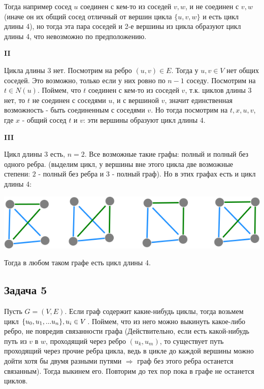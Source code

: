 \documentclass{article}
\begin{document}
 Тогда например сосед $u$ соединен с кем-то из соседей $v, w$, и не соединен с $v, w$ (иначе он их общий сосед отличный от вершин цикла $\{u, v, w\}$ и есть цикл длины 4), но тогда эта пара соседей и 2-е вершины из цикла образуют цикл длины 4, что невозможно по предположению. 

\textbf{II}

Цикла длины 3 нет. Посмотрим на ребро $(u, v) \in E$. Тогда у $u, v \in V$ нет общих соседей. Это  возможно, только если у них ровно по $ n - 1 $ соседу. Посмотрим на $t \in N(u)$. Поймем, что $t$ соединен с кем-то из соседей $v$, т.к. циклов длины 3 нет, то $t$ не соединен с соседями $u$, и с вершиной $v$, значит единственная возможность - быть соединенным с соседями $v$. Но тогда посмотрим на ${t, x, u, v}$, где $x$ - общий сосед $t$ и $v$: эти вершины образуют цикл длины 4.
 
\textbf{III}

Цикл длины 3 есть, $n = 2$. Все возможные такие графы: полный и полный без одного ребра. (выделим цикл, у вершины вне этого цикла две возможные степени: $2$ - полный без ребра и $3$ - полный граф). Но в этих графах есть и цикл длины 4:

\includegraphics[scale=0.5]{3_5.png}

Тогда в любом таком графе есть цикл длины 4.
 \\
 
\begin{center}
	\subsection*{Задача 5}
\end{center}
Пусть $ G = (V, E) $. 
Если граф содержит какие-нибудь циклы, тогда возьмем цикл $ \{u_0, u_1, ... u_n\},\space u_i \in V$. Поймем, что из него можно выкинуть какое-либо ребро, не повредив связанности графа (Действительно, если есть какой-нибудь путь из $v $ в $w$, проходящий через ребро $ (u_k, u_m) $, то существует путь проходящий через прочие ребра цикла, ведь в цикле до каждой вершины можно дойти хотя бы двумя разными путями $\Rightarrow$ граф без этого ребра останется связанным). Тогда выкинем его. Повторим до тех пор пока в графе не останется циклов. 
\end{document}
